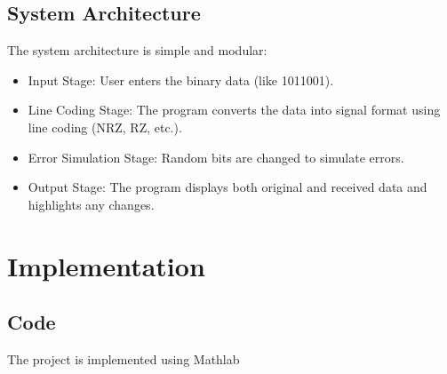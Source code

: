 \documentclass[12pt]{report}
\begin{document}
\subsection{System Architecture}
The system architecture is simple and modular:
\begin{itemize}
     
\item Input Stage:
User enters the binary data (like 1011001).
\item Line Coding Stage:
The program converts the data into signal format using line coding (NRZ, RZ, etc.).
\item Error Simulation Stage:
Random bits are changed to simulate errors.
\item Output Stage:
The program displays both original and received data and highlights any changes.

\end{itemize}

\section{Implementation}

\subsection{Code}
The project is implemented using  Mathlab
\end{document}
